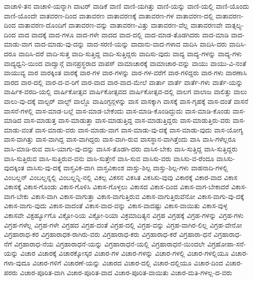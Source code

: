 {ವಾಚಾಳಿ-ತನ
ವಾಚಾಳಿ-ಯನ್ನಾಗಿ
ವಾಟರ್
ವಾಡಿಕೆ
ವಾಣಿ
ವಾಣಿ-ಯಗಿತ್ತು
ವಾಣಿ-ಯನ್ನು
ವಾಣಿ-ಯಲ್ಲಿ
ವಾಣಿ-ಯೊಂದು
ವಾಣಿ-ಯೊಂದೇ
ವಾತವರಣ-ದಿಂದ
ವಾತಾವರಣ
ವಾತಾವರಣಕ್ಕೆ
ವಾತಾವರಣ-ಗಳ
ವಾತಾವರಣ-ದಲ್ಲಿ
ವಾತಾವರಣ-ದಿಂದ
ವಾತಾವರಣ-ದೊಂದಿಗೆ
ವಾತಾವರಣ-ವನ್ನು
ವಾತಾವರಣ-ವಿತ್ತು
ವಾತಾವರಣ-ವೆಲ್ಲ
ವಾತಾವರಣವೇ
ವಾತ್ಸಲ್ಯ-ದಿಂದ
ವಾದ
ವಾದಕ್ಕೆ
ವಾದ-ಗಳೂ
ವಾದ-ಗಳೇ
ವಾದದ
ವಾದ-ದಲ್ಲಿ
ವಾದ-ಮಾಡ-ತೊಡಗಿದರು
ವಾದ-ಮಾಡಿ
ವಾದ-ಮಾಡು-ವಾಗ
ವಾದ-ಮಾಡು-ವು-ದನ್ನು
ವಾದ-ಸರಣಿ-ಯನ್ನು
ವಾದಾನು-ವಾದ-ಗಳಾದ
ವಾದಿಸಿ
ವಾದಿಸಿ-ದರು
ವಾದಿಸಿ-ದರೂ
ವಾದಿಸಿ-ದರೆ
ವಾದಿ-ಸುತ್ತ
ವಾದಿ-ಸುತ್ತಿದ್ದ
ವಾದಿ-ಸುತ್ತಿದ್ದರು
ವಾದಿಸು-ವುದು
ವಾದ್ಯ
ವಾದ್ಯ-ಗಳನ್ನು
ವಾದ್ಯ-ಗಳು
ವಾದ್ಯಧ್ವನಿ-ಯಿಂದ
ವಾದ್ವಾನ್ಗೆ
ವಾನಪ್ರಸ್ಥರಾದ
ವಾಪಸ್
ವಾಮಾಚಾರಕ್ಕೆ
ವಾಮಾಚಾರ-ವನ್ನು
ವಾಯು
ವಾಯು-ವಿ-ನಂತೆ
ವಾಯುವ್ಯ
ವಾರ
ವಾರಕ್ಕಿಂತ
ವಾರಕ್ಕೆ
ವಾರ-ಗಳ
ವಾರ-ಗಳನ್ನು
ವಾರ-ಗಳ-ವರೆಗೆ
ವಾರ-ಗಳಿದ್ದರು
ವಾರ-ಗಳು
ವಾರಣಾಸಿ
ವಾರದ
ವಾರ-ದಲ್ಲಿ
ವಾರ-ದ-ವ-ರಿಗೆ
ವಾರ-ವಾದ
ವಾರ-ವಾದ-ಮೇಲೆ
ವಾರ್ತಾ
ವಾರ್ತೆ
ವಾರ್ತೆ-ಗಳು
ವಾರ್ತೆ-ಯನ್ನು
ವಾರ್ಷಿಕ-ವರದಿ-ಯಲ್ಲಿ
ವಾರ್ಷಿಕೋತ್ಸವ
ವಾರ್ಷಿಕೋತ್ಸವದ
ವಾರ್ಷಿಕೋತ್ಸವ-ದಲ್ಲಿ
ವಾಲಗ
ವಾಲಾಜ
ವಾಲಿತ್ತು
ವಾಲು
ವಾಲು-ವು-ದಕ್ಕೆ
ವಾಲ್ಟರ್
ವಾಲ್ಟ್
ವಾಲ್ಡೊ
ವಾಷಿಂಗ್ಟನ್ಗಳನ್ನು
ವಾಸ
ವಾಸಕ್ಕಾಗಿ
ವಾಸಕ್ಕೆ
ವಾಸ-ಗೃಹಕ್ಕೆ
ವಾಸ-ದಂತೆ
ವಾಸನೆ
ವಾಸನೆ-ಗಳಲ್ಲಿ
ವಾಸ-ಮಾಡ-ಬಲ್ಲೆ
ವಾಸ-ಮಾಡ-ಬೇಕೆಂದು
ವಾಸ-ಮಾಡಿ-ಕೊಂಡಿದ್ದುದು
ವಾಸ-ಮಾಡಿ-ಕೊಂಡು
ವಾಸ-ಮಾಡಿದ
ವಾಸ-ಮಾಡುತ್ತ
ವಾಸ-ಮಾಡುತ್ತಾ
ವಾಸ-ಮಾಡುತ್ತಿದ್ದ
ವಾಸ-ಮಾಡುತ್ತಿದ್ದರು
ವಾಸ-ಮಾಡುತ್ತಿರು-ವರು
ವಾಸ-ಮಾಡು-ವಂತೆ
ವಾಸ-ಮಾಡು-ವರು
ವಾಸ-ಮಾಡು-ವಾಗ
ವಾಸ-ಮಾಡು-ವು-ದಕ್ಕೆ
ವಾಸ-ಮಾಡು-ವುದು
ವಾಸ-ಯೋಗ್ಯ
ವಾಸ-ವಾಗಿತ್ತು
ವಾಸ-ವಾಗಿದ್ದ
ವಾಸ-ವಾಗಿದ್ದರು
ವಾಸ-ವಾಗಿ-ರುವ
ವಾಸಸ್ಥಾನ-ವಾಗಿತ್ತೆಂದು
ವಾಸಿ
ವಾಸಿ-ಗಳೆಲ್ಲರೂ
ವಾಸಿ-ಮಾಡಿ-ರುವ
ವಾಸಿ-ಯಾಗು-ವು-ದನ್ನು
ವಾಸಿಸ-ತೊಡಗಿ-ದರು
ವಾಸಿಸ-ಬೇಕು
ವಾಸಿ-ಸುತ್ತಿದ್ದ
ವಾಸಿ-ಸುತ್ತಿದ್ದರು
ವಾಸಿ-ಸುತ್ತಿರುವ
ವಾಸಿ-ಸುತ್ತಿರುವ-ವನು
ವಾಸಿ-ಸುತ್ತೇನೆ
ವಾಸಿ-ಸುವ
ವಾಸಿಸು-ವರು
ವಾಸಿಸು-ವ-ರೆಂದೂ
ವಾಸಿಸು-ವುದಕ್ಕಿಂತ
ವಾಸಿಸು-ವು-ದಕ್ಕೆ
ವಾಸ್ತವಿಕ-ವಾಗಿ
ವಾಸ್ತವಿಕಾಂಶ
ವಾಸ್ತು-ಶಿಲ್ಪ
ವಾಸ್ತು-ಶಿಲ್ಪ-ಗಳು
ವಾಹನಾದಿ-ಗಳಲ್ಲಿ
ವಿಂಬಲ್ಡನ್
ವಿಂಬಲ್ಡನ್ನಲ್ಲಿ
ವಿಂಬಲ್ಡನ್ನಿ-ನಲ್ಲಿ
ವಿಕಲ್ಪ
ವಿಕಸನ
ವಿಕಸಿತ
ವಿಕಸಿಸು-ವುವು
ವಿಕಾರಕ್ಕೆ
ವಿಕಾರ-ವಾದ
ವಿಕಾಸ
ವಿಕಾಸಕ್ಕೆ
ವಿಕಾಸ-ಗೊಂಡು
ವಿಕಾಸ-ಗೊಳಿಸಿ
ವಿಕಾಸ-ಗೊಳ್ಳಲು
ವಿಕಾಸದ
ವಿಕಾಸ-ದಿಂದ
ವಿಕಾಸ-ವಾಗ-ಬೇಕಾದರೆ
ವಿಕಾಸ-ವಾಗ-ಬೇಕು
ವಿಕಾಸ-ವಾಗಿ
ವಿಕಾಸ-ವಾಗುತ್ತಾ
ವಿಕಾಸ-ವಾಗುತ್ತಿರುವ
ವಿಕಾಸ-ವಾಗುತ್ತಿರುವೆನೋ
ವಿಕಾಸ-ವಾಗು-ವು-ದಕ್ಕೆ
ವಿಕಾಸ-ವಾಗು-ವುದು
ವಿಕಾಸ-ವಾದಂತೆ
ವಿಕಾಸ-ವಾದ-ವನ್ನು
ವಿಕಾಸ-ವಾದಷ್ಟು
ವಿಕಾಸ-ವಾಯಿತು
ವಿಕಾಸ-ವುಳ್ಳ
ವಿಕಾಸವೇ
ವಿಕ್ಟರ್ಹ್ಯೂಗೊ
ವಿಕ್ಟೋ-ರಿಯ
ವಿಕ್ಟೋ-ರಿಯಾ
ವಿಕ್ರಮಾದಿತ್ಯನ
ವಿಗ್ರಹ
ವಿಗ್ರಹಕ್ಕೆ
ವಿಗ್ರಹ-ಗಳನ್ನು
ವಿಗ್ರಹ-ಗಳು
ವಿಗ್ರಹ-ಗಳೆಲ್ಲ
ವಿಗ್ರಹ-ಗಳೇ
ವಿಗ್ರಹದ
ವಿಗ್ರಹ-ದಂತೆ
ವಿಗ್ರಹ-ದಲ್ಲಿ
ವಿಗ್ರಹ-ವನ್ನು
ವಿಗ್ರಹ-ವಾಗಿರ-ಲಿಲ್ಲ
ವಿಗ್ರಹ-ವೇನೋ
ವಿಗ್ರಹಾರಾಧ-ಕರ
ವಿಗ್ರಹಾರಾಧಕ-ರಾಗಿರು-ವರು
ವಿಗ್ರಹಾರಾಧ-ಕರು
ವಿಗ್ರಹಾರಾಧ-ಕರೆ
ವಿಗ್ರಹಾರಾ-ಧನೆ
ವಿಗ್ರಹಾರಾಧ-ನೆಗೆ
ವಿಗ್ರಹಾರಾಧ-ನೆಯ
ವಿಗ್ರಹಾರಾಧನೆ-ಯನ್ನು
ವಿಗ್ರಹಾರಾಧನೆ-ಯಲ್ಲಿ
ವಿಗ್ರಹಾರಾಧನೆ-ಯಿಂದಲೇ
ವಿಗ್ರಹೋಪಾ-ಸನೆ-ಯನ್ನು
ವಿಚಾರ
ವಿಚಾರಕ್ಕೆ
ವಿಚಾರಕ್ಕೋಸ್ಕರ
ವಿಚಾರ-ಗಳ
ವಿಚಾರ-ಗಳನ್ನು
ವಿಚಾರ-ಗಳಲ್ಲಿ
ವಿಚಾರ-ಗಳಲ್ಲಿಯೂ
ವಿಚಾರ-ಗಳಾ-ವುದೂ
ವಿಚಾರ-ಗಳಿಗೆ
ವಿಚಾರಣೆ-ಯನ್ನು
ವಿಚಾರದ
ವಿಚಾರ-ದಲ್ಲಿ
ವಿಚಾರ-ದಲ್ಲಿಯೂ
ವಿಚಾರ-ದಿಂದ
ವಿಚಾರ-ಪರರು
ವಿಚಾರ-ಪೂರಿತ-ವಾಗಿ
ವಿಚಾರ-ಪೂರಿತ-ವಾದ
ವಿಚಾರ-ಪೂರಿತ-ವಾಯಿತು
ವಿಚಾರ-ಮತಿ-ಗಳಲ್ಲ-ದ-ವರು
}
